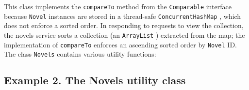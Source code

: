 \documentclass[12pt]{article}
\begin{document}
This class implements the \verb|compareTo| method from the \verb|Comparable| interface because \verb|Novel| instances are stored in a thread-safe \verb|ConcurrentHashMap| , which does not enforce a sorted order. In responding to requests to view the collection, the novels service sorts a collection (an \verb|ArrayList| ) extracted from the map; the implementation of \verb|compareTo| enforces an ascending sorted order by \verb|Novel| ID.\\

The class \verb|Novels| contains various utility functions:

\subsection{Example 2. The Novels utility class}

\newpage
\end{document}
